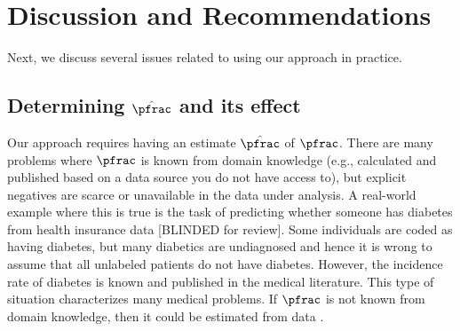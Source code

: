 \newcommand{\covtype}{\texttt{covtype}\xspace}
\newcommand{\sensit}{\texttt{sensit}\xspace}

\newcommand{\resultcurves}[2]{
\begin{figure}[!h]
\centering
\subfigure[\covtype.]{\texttt{[image: \#1\_covtype\_pu\_resvm.pdf]}}\qquad
\subfigure[\sensit.]{\texttt{[image: \#1\_sensit\_2\_semi\_resvm.pdf]}}\\
\caption{#2}
\label{fig:results-#1}
\end{figure}
}

\newcommand{\resultcurvesnew}[2]{
\begin{figure}[!h]
\centering
\subfigure[Rank CDF for \covtype.]{\texttt{[image: \#1\_cdf.pdf]}}\qquad
\subfigure[ROC curves for \covtype.]{\texttt{[image: \#1\_roc.pdf]}}\qquad
\subfigure[PR curves for \covtype.]{\texttt{[image: \#1\_pr.pdf]}}
\caption{#2}
\label{fig:results-#1}
\end{figure}
}

\section{Discussion and Recommendations}
Next, we discuss several issues related to using our approach in practice. 

\subsection{Determining $\hat{\pfrac}$ and its effect}

Our approach requires having an estimate $\hat{\pfrac}$ of $\pfrac$. There are many problems where $\pfrac$ is known from domain knowledge (e.g., calculated and published based on a data source you do not have access to), but explicit negatives are scarce or unavailable in the data under analysis. A real-world example where this is true is the task of predicting whether someone has diabetes from health insurance data [BLINDED for review]. Some individuals are coded as having diabetes, but many diabetics are undiagnosed and hence it is wrong to assume that all unlabeled patients do not have diabetes. However, the incidence rate of diabetes is known and published in the medical literature. This type of situation characterizes many medical problems. If $\pfrac$ is not known from domain knowledge, then it could be estimated from data \citep{Elkan:2008:LCO:1401890.1401920, scottblanchard,scholkopf2001estimating}.

